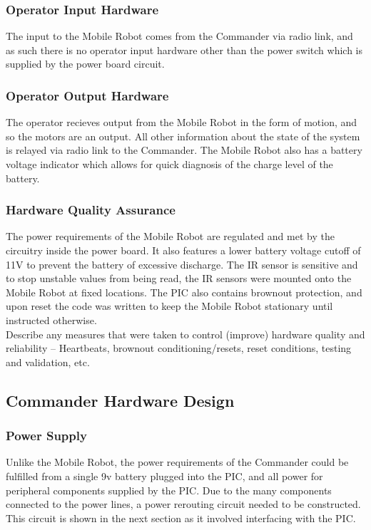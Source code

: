 \documentclass[11pt,a4paper]{article}
\begin{document}
    \subsubsection{Operator Input Hardware}
      The input to the Mobile Robot comes from the Commander via radio link, and as such there is no operator input hardware other than the power switch which is supplied by the power board circuit.
    \subsubsection{Operator Output Hardware}
      The operator recieves output from the Mobile Robot in the form of motion, and so the motors are an output. All other information about the state of the system is relayed via radio link to the Commander. The Mobile Robot also has a battery voltage indicator which allows for quick diagnosis of the charge level of the battery.
    \subsubsection{Hardware Quality Assurance}
      The power requirements of the Mobile Robot are regulated and met by the circuitry inside the power board. It also features a lower battery voltage cutoff of 11V to prevent the battery of excessive discharge. The IR sensor is sensitive and to stop unstable values from being read, the IR sensors were mounted onto the Mobile Robot at fixed locations. The PIC also contains brownout protection, and upon reset the code was written to keep the Mobile Robot stationary until instructed otherwise.\\

    Describe any measures that were taken to control (improve) hardware quality and reliability – Heartbeats, brownout conditioning/resets, reset conditions, testing and validation, etc.

  \subsection{Commander Hardware Design}
    \subsubsection{Power Supply}
      Unlike the Mobile Robot, the power requirements of the Commander could be fulfilled from a single 9v battery plugged into the PIC, and all power for peripheral components supplied by the PIC. Due to the many components connected to the power lines, a power rerouting circuit needed to be constructed. This circuit is shown in the next section as it involved interfacing with the PIC.
\end{document}
